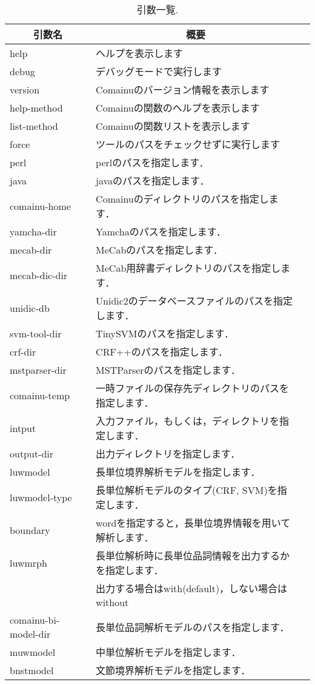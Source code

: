 \documentclass[titlepage]{jarticle}
\begin{document}
\begin{table}[!ht]
\begin{center}
\caption{引数一覧.}
\begin{tabular}{|l|l|l|}
\hline
\multicolumn{1}{|c|}{引数名} & \multicolumn{1}{c|}{概要} \\ \hline
help & ヘルプを表示します \\ \hline
debug & デバッグモードで実行します \\ \hline
version & Comainuのバージョン情報を表示します \\ \hline
help-method & Comainuの関数のヘルプを表示します \\ \hline
list-method & Comainuの関数リストを表示します \\ \hline
force & ツールのパスをチェックせずに実行します \\ \hline
perl & perlのパスを指定します． \\ \hline
java & javaのパスを指定します． \\ \hline
comainu-home & Comainuのディレクトリのパスを指定します． \\ \hline
yamcha-dir & Yamchaのパスを指定します． \\ \hline
mecab-dir & MeCabのパスを指定します． \\ \hline
mecab-dic-dir & MeCab用辞書ディレクトリのパスを指定します． \\ \hline
unidic-db & Unidic2のデータベースファイルのパスを指定します． \\ \hline
svm-tool-dir & TinySVMのパスを指定します． \\ \hline
crf-dir & CRF++のパスを指定します． \\ \hline
mstparser-dir & MSTParserのパスを指定します． \\ \hline
comainu-temp & 一時ファイルの保存先ディレクトリのパスを指定します． \\ \hline \hline

intput & 入力ファイル，もしくは，ディレクトリを指定します． \\ \hline
output-dir & 出力ディレクトリを指定します． \\ \hline
luwmodel & 長単位境界解析モデルを指定します． \\ \hline
luwmodel-type & 長単位解析モデルのタイプ(CRF, SVM)を指定します． \\ \hline
boundary & wordを指定すると，長単位境界情報を用いて解析します． \\ \hline
luwmrph & 長単位解析時に長単位品詞情報を出力するかを指定します．\\
& 出力する場合はwith(default)，しない場合はwithout \\ \hline
comainu-bi-model-dir & 長単位品詞解析モデルのパスを指定します． \\ \hline
muwmodel & 中単位解析モデルを指定します． \\ \hline
bnstmodel & 文節境界解析モデルを指定します． \\ \hline

\end{tabular}
\label{func_list}
\end{center}
\end{table}
\end{document}

